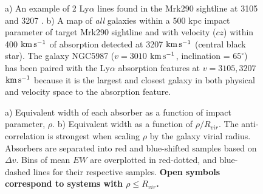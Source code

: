 \documentclass[twocolumn,tighten]{aastex6}
\begin{document}
\begin{figure}[t!]
  \caption{\small{a) An example of 2 Ly$\alpha$ lines found in the Mrk290 sightline at 3105 and 3207 . b) A map of \textit{all} galaxies within a 500 kpc impact parameter of target Mrk290 sightline and with velocity ($cz$) within 400 $\rm km\, s^{-1}$ of absorption detected at 3207 $\rm km\, s^{-1}$ (central black star). The galaxy NGC5987 ($v=3010$ $\rm km\, s^{-1}$, inclination = $65^{\circ}$) has been paired with the Ly$\alpha$ absorption features at $v=3105, 3207$ $\rm km\, s^{-1}$ because it is the largest and closest galaxy in both physical and velocity space to the absorption feature.}}
\vspace{5pt}
\end{figure}

\begin{figure}[t]
\centering
{}
\caption{\small{a) Equivalent width of each absorber as a function of impact parameter, $\rho$. b) Equivalent width as a function of $\rho/R_{vir}$. The anti-correlation is strongest when scaling $\rho$ by the galaxy virial radius. Absorbers are separated into red and blue-shifted samples based on $\Delta v$. Bins of mean $EW$ are overplotted in red-dotted, and blue-dashed lines for their respective samples. \textbf{Open symbols correspond to systems with $\rho \leq R_{vir}$.}}}
\vspace{5pt}
\end{figure}
\end{document}
